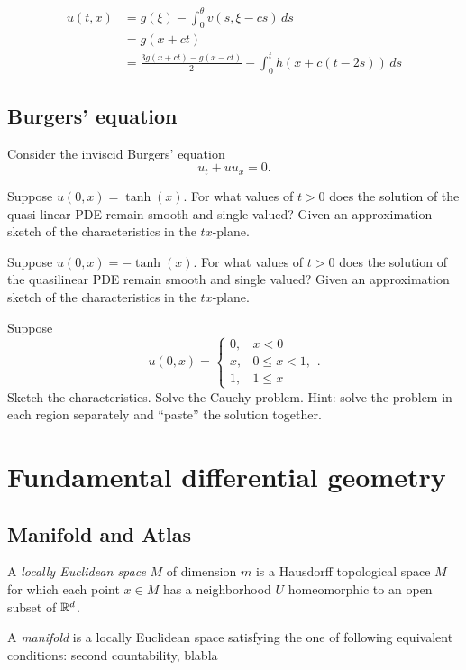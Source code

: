 \documentclass[11pt]{article}
\let\realsection\section
\renewcommand\section{\newpage\realsection}
\begin{document}
\begin{align*}
u(t,x)&=g(\xi)-\int_0^\theta v(s,\xi-cs)\,ds\\
&=g(x+ct)\\
&=\frac{3g(x+ct)-g(x-ct)}2-\int_0^th(x+c(t-2s))\,ds
\end{align*}



\clearpage
\subsection{Burgers' equation}

Consider the inviscid Burgers' equation
\[u_t+uu_x=0.\]
\begin{cond}
\item Suppose $u(0,x)=\tanh(x)$. For what values of $t>0$ does the solution of the quasi-linear PDE remain smooth and single valued? Given an approximation sketch of the characteristics in the $tx$-plane.
\item Suppose $u(0,x)=-\tanh(x)$. For what values of $t>0$ does the solution of the quasilinear PDE remain smooth and single valued? Given an approximation sketch of the characteristics in the $tx$-plane.
\item Suppose
\[u(0,x)=\begin{cases}0,&x<0\\x,&0\le x<1,\\1,&1\le x\end{cases}.\]
Sketch the characteristics. Solve the Cauchy problem. Hint: solve the problem in each region separately and ``paste'' the solution together.
\end{cond}











\section{Fundamental differential geometry}

\subsection{Manifold and Atlas}
\begin{defn}
A \emph{locally Euclidean space} $M$ of dimension $m$ is a Hausdorff topological space $M$ for which each point $x\in M$ has a neighborhood $U$ homeomorphic to an open subset of $\mathbb{R}^d$.
\end{defn}
\begin{defn}
A \emph{manifold} is a locally Euclidean space satisfying the one of following equivalent conditions: second countability, blabla%
\end{defn}
\end{document}
